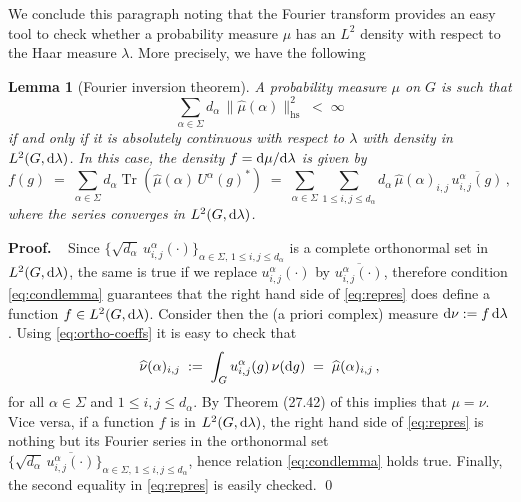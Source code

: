 \documentclass[a4paper,reqno,11pt]{amsart}
\numberwithin{equation}{section}
\newtheorem{lemma}[theorem]{Lemma}
\newcommand{\ga}{\alpha}
\newcommand{\gl}{\lambda}
\newcommand{\dd}{\text{\rm d}}             %
\def\proof{\noindent\textbf{Proof.} \ }
\DeclareMathOperator{\tr}{Tr}
\newcommand{\somb}{\widehat} %
\begin{document}
We conclude this paragraph noting that
the Fourier transform provides
an easy tool to check whether a probability measure
$\mu$ has an $L^2$ density with respect
to the Haar measure $\lambda$. More precisely, we have the following

\smallskip
\begin{lemma}[Fourier inversion theorem] \label{lem:Fourinv}
A probability measure $\mu$ on $G$ is such that
\begin{equation} \label{eq:condlemma}
	\sum_{\alpha \in \Sigma} d_\alpha \, \|\somb \mu(\alpha)\|_{\mathrm{hs}}^2
	\;<\; \infty
\end{equation}
if and only if it is absolutely continuous with respect to $\lambda$ with density
in $L^2(G,\dd\lambda)$.
In this case, the density $f = \dd \mu/\dd \gl$ is given by
\begin{equation} \label{eq:repres}
	f(g)  \;=\;
\sum_{\alpha\in\Sigma} d_\alpha \tr( \somb \mu(\alpha) \, U^\alpha(g)^* )
\;=\; \sum_{\alpha\in\Sigma} \sum_{1 \le i,j \le d_\ga}
d_\alpha \, \somb\mu(\alpha)_{i,j} \,
\overline{u^\alpha_{i,j}(g)} \,,
\end{equation}
where the series converges in $L^2(G,\dd\gl)$.
\end{lemma}
\smallskip

\proof
Since $\{\sqrt{d_\alpha} \, u^\alpha_{i,j}(\cdot)\}_{\alpha \in \Sigma,\,
1 \le i,j \le d_\alpha}$ is a complete orthonormal set in $L^2(G, \dd\lambda)$,
the same is true if we replace
$u^\alpha_{i,j}(\cdot)$ by $\overline{u^\alpha_{i,j}(\cdot)}$,
therefore condition \eqref{eq:condlemma} guarantees that the right hand side
of \eqref{eq:repres} does define a function $f \in L^2(G,\dd \gl)$.
Consider then the (a priori complex) measure $\dd\nu := f \, \dd \gl$.
Using \eqref{eq:ortho-coeffs} it is easy to check that
\begin{equation}
	\somb \nu (\ga)_{i,j} \;:=\; \int_G u^\ga_{i,j}(g) \, \nu(\dd g)
	\;=\; \somb \mu(\ga)_{i,j}\,,
\end{equation}
for all $\ga \in \Sigma$ and $1 \le i,j \le d_\ga$.
By Theorem (27.42) of \cite{cf:Hewitt2} this implies that $\mu=\nu$.
Vice versa, if a function $f$ is in $L^2(G, \dd \gl)$,
the right hand side of \eqref{eq:repres} is nothing
but its Fourier series in the orthonormal set
$\{\sqrt{d_\alpha} \, \overline{u^\alpha_{i,j}(\cdot)}\}_{\alpha \in \Sigma,\,
1 \le i,j \le d_\alpha}$, hence relation \eqref{eq:condlemma} holds true.
Finally, the second equality in \eqref{eq:repres} is easily checked.
\qed
\smallskip
\end{document}
